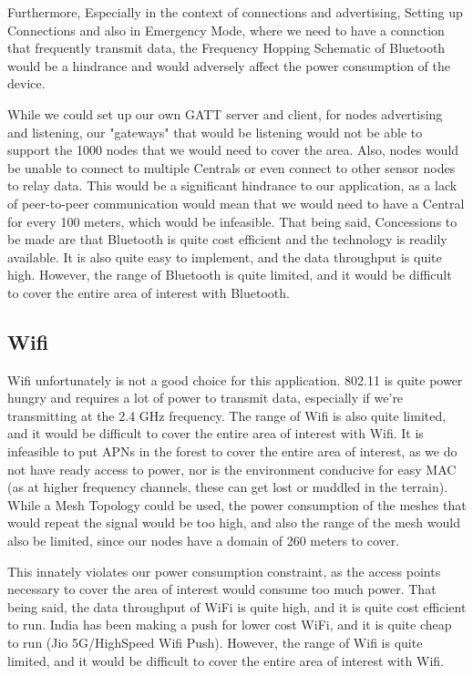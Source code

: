 Furthermore, Especially in the context of connections and advertising, Setting up Connections and also in Emergency Mode, where we need to have a connction that frequently transmit data, the Frequency Hopping Schematic of Bluetooth would be a hindrance and would adversely affect the power consumption of the device.

While we could set up our own GATT server and client, for nodes advertising and listening, our "gateways" that would be listening would not be able to support the 1000 nodes that we would need to cover the area. Also, nodes would be unable to connect to multiple Centrals or even connect to other sensor nodes to relay data. This would be a significant hindrance to our application, as a lack of peer-to-peer communication would mean that we would need to have a Central for every 100 meters, which would be infeasible.
That being said, Concessions to be made are that Bluetooth is quite cost efficient and the technology is readily available. It is also quite easy to implement, and the data throughput is quite high. However, the range of Bluetooth is quite limited, and it would be difficult to cover the entire area of interest with Bluetooth.
\subsection{Wifi}
Wifi unfortunately is not a good choice for this application. 802.11 is quite power hungry and requires a lot of power to transmit data, especially if we're transmitting at the 2.4 GHz frequency. The range of Wifi is also quite limited, and it would be difficult to cover the entire area of interest with Wifi. It is infeasible to put APNs in the forest to cover the entire area of interest, as we do not have ready access to power, nor is the environment conducive for easy MAC (as at higher frequency channels, these can get lost or muddled in the terrain). While a Mesh Topology could be used, the power consumption of the meshes that would repeat the signal would be too high, and also the range of the mesh would also be limited, since our nodes have a domain of 260 meters to cover. 

This innately violates our power consumption constraint, as the access points necessary to cover the area of interest would consume too much power. That being said, the data throughput of WiFi is quite high, and it is quite cost efficient to run. India has been making a push for lower cost WiFi, and it is quite cheap to run (Jio 5G/HighSpeed Wifi Push). However, the range of Wifi is quite limited, and it would be difficult to cover the entire area of interest with Wifi.

